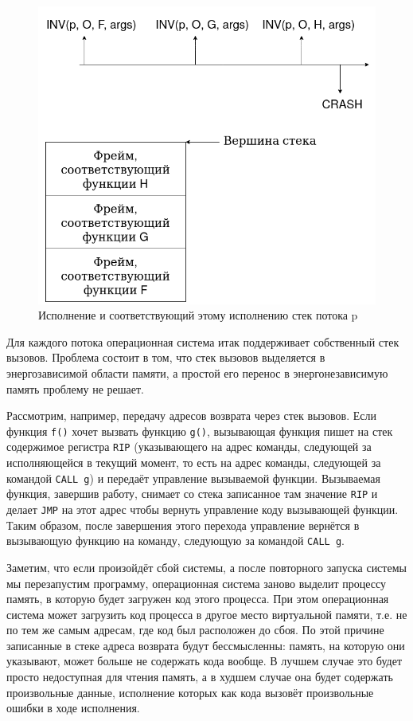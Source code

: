 \documentclass[times,specification,annotation]{itmo-student-thesis}
\begin{document}
\begin{figure}[H]
  \centering
  \caption{Исполнение и соответствующий этому исполнению стек потока p}
  \label{execution-and-stack-pic}
  \includegraphics[width=\linewidth]{execution_and_stack.png}
\end{figure}

Для каждого потока операционная система итак поддерживает собственный стек вызовов. Проблема состоит в том, что стек вызовов выделяется в энергозависимой области памяти, а простой его перенос в энергонезависимую память проблему не решает.

Рассмотрим, например, передачу адресов возврата через стек вызовов. Если функция \texttt{f()} хочет вызвать функцию \texttt{g()}, вызывающая функция пишет на стек содержимое регистра \texttt{RIP} (указывающего на адрес команды, следующей за исполняющейся в текущий момент, то есть на адрес команды, следующей за командой \texttt{CALL g}) и передаёт управление вызываемой функции. Вызываемая функция, завершив работу, снимает со стека записанное там значение \texttt{RIP} и делает \texttt{JMP} на этот адрес чтобы вернуть управление коду вызывающей функции. Таким образом, после завершения этого перехода управление вернётся в вызывающую функцию на команду, следующую за командой \texttt{CALL g}.

Заметим, что если произойдёт сбой системы, а после повторного запуска системы мы перезапустим программу, операционная система заново выделит процессу память, в которую будет загружен код этого процесса. При этом операционная система может загрузить код процесса в другое место виртуальной памяти, т.е. не по тем же самым адресам, где код был расположен до сбоя. По этой причине записанные в стеке адреса возврата будут бессмысленны: память, на которую они указывают, может больше не содержать кода вообще. В лучшем случае это будет просто недоступная для чтения память, а в худшем случае она будет содержать произвольные данные, исполнение которых как кода вызовёт произвольные ошибки в ходе исполнения.
\end{document}
